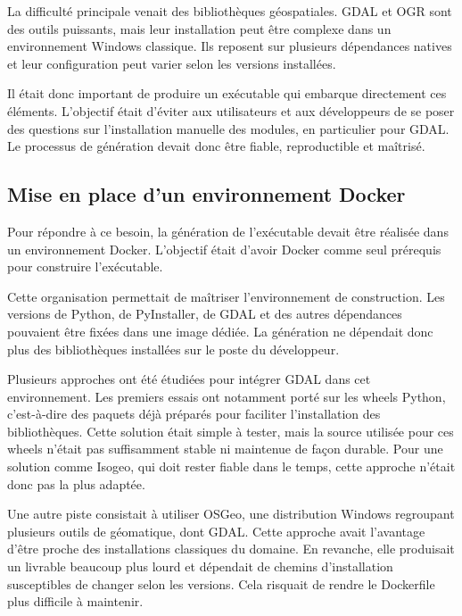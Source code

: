 La difficulté principale venait des bibliothèques géospatiales. GDAL et OGR
sont des outils puissants, mais leur installation peut être complexe dans un
environnement Windows classique. Ils reposent sur plusieurs dépendances natives
et leur configuration peut varier selon les versions installées.

Il était donc important de produire un exécutable qui embarque directement ces
éléments. L'objectif était d'éviter aux utilisateurs et aux développeurs de se
poser des questions sur l'installation manuelle des modules, en particulier pour
GDAL. Le processus de génération devait donc être fiable, reproductible et
maîtrisé.


\subsection{Mise en place d'un environnement Docker}
\label{subsec:environnement_docker}

Pour répondre à ce besoin, la génération de l'exécutable devait être réalisée
dans un environnement Docker. L'objectif était d'avoir Docker comme seul
prérequis pour construire l'exécutable.

Cette organisation permettait de maîtriser l'environnement de construction. Les
versions de Python, de PyInstaller, de GDAL et des autres dépendances pouvaient
être fixées dans une image dédiée. La génération ne dépendait donc plus des
bibliothèques installées sur le poste du développeur.

Plusieurs approches ont été étudiées pour intégrer GDAL dans cet environnement.
Les premiers essais ont notamment porté sur les wheels Python, c'est-à-dire des
paquets déjà préparés pour faciliter l'installation des bibliothèques. Cette
solution était simple à tester, mais la source utilisée pour ces wheels n'était
pas suffisamment stable ni maintenue de façon durable. Pour une solution comme
Isogeo, qui doit rester fiable dans le temps, cette approche n'était donc pas la
plus adaptée.

Une autre piste consistait à utiliser OSGeo, une distribution Windows regroupant
plusieurs outils de géomatique, dont GDAL. Cette approche avait l'avantage
d'être proche des installations classiques du domaine. En revanche, elle
produisait un livrable beaucoup plus lourd et dépendait de chemins
d'installation susceptibles de changer selon les versions. Cela risquait de
rendre le Dockerfile plus difficile à maintenir.

